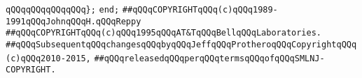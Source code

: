 \newline
\verb|qQQqqQQqqQQqqQQq};|\newline
\verb|end;|\newline
\newline
\verb|##qQQqCOPYRIGHTqQQq(c)qQQq1989-1991qQQqJohnqQQqH.qQQqReppy|\newline
\verb|##qQQqCOPYRIGHTqQQq(c)qQQq1995qQQqAT&TqQQqBellqQQqLaboratories.|\newline
\verb|##qQQqSubsequentqQQqchangesqQQqbyqQQqJeffqQQqProtheroqQQqCopyrightqQQq(c)qQQq2010-2015,|\newline
\verb|##qQQqreleasedqQQqperqQQqtermsqQQqofqQQqSMLNJ-COPYRIGHT.|\newline

